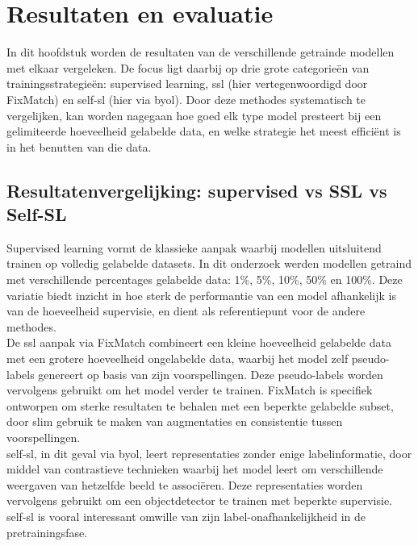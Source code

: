 \chapter{Resultaten en evaluatie}
\label{ch:resultaten-evaluatie}

In dit hoofdstuk worden de resultaten van de verschillende getrainde modellen met elkaar vergeleken. De focus ligt daarbij op drie grote categorieën van trainingsstrategieën: supervised learning, \gls{ssl} (hier vertegenwoordigd door FixMatch) en \gls{self-sl} (hier via \gls{byol}). Door deze methodes systematisch te vergelijken, kan worden nagegaan hoe goed elk type model presteert bij een gelimiteerde hoeveelheid gelabelde data, en welke strategie het meest efficiënt is in het benutten van die data.

\section{Resultatenvergelijking: supervised vs SSL vs Self-SL}

Supervised learning vormt de klassieke aanpak waarbij modellen uitsluitend trainen op volledig gelabelde datasets. In dit onderzoek werden modellen getraind met verschillende percentages gelabelde data: 1\%, 5\%, 10\%, 50\% en 100\%. Deze variatie biedt inzicht in hoe sterk de performantie van een model afhankelijk is van de hoeveelheid supervisie, en dient als referentiepunt voor de andere methodes. \\

De \gls{ssl} aanpak via FixMatch combineert een kleine hoeveelheid gelabelde data met een grotere hoeveelheid ongelabelde data, waarbij het model zelf pseudo-labels genereert op basis van zijn voorspellingen. Deze pseudo-labels worden vervolgens gebruikt om het model verder te trainen. FixMatch is specifiek ontworpen om sterke resultaten te behalen met een beperkte gelabelde subset, door slim gebruik te maken van augmentaties en consistentie tussen voorspellingen. \\

\Gls{self-sl}, in dit geval via \gls{byol}, leert representaties zonder enige labelinformatie, door middel van contrastieve technieken waarbij het model leert om verschillende weergaven van hetzelfde beeld te associëren. Deze representaties worden vervolgens gebruikt om een objectdetector te trainen met beperkte supervisie. \Gls{self-sl} is vooral interessant omwille van zijn label-onafhankelijkheid in de pretrainingsfase. \\

